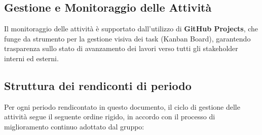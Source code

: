\documentclass[a4paper, 11pt, oneside]{scrartcl} %
\begin{document}
\subsection{Gestione e Monitoraggio delle Attività}
Il monitoraggio delle attività è supportato dall'utilizzo di \textbf{GitHub Projects}, che funge da strumento per la gestione visiva dei task (Kanban Board), garantendo trasparenza sullo stato di avanzamento dei lavori verso tutti gli stakeholder interni ed esterni.

\subsection{Struttura dei rendiconti di periodo}
\label{sec:struttura_rendiconti}
Per ogni periodo rendicontato in questo documento, il ciclo di gestione delle attività segue il seguente ordine rigido, in accordo con il processo di miglioramento continuo adottato dal gruppo:
\end{document}
